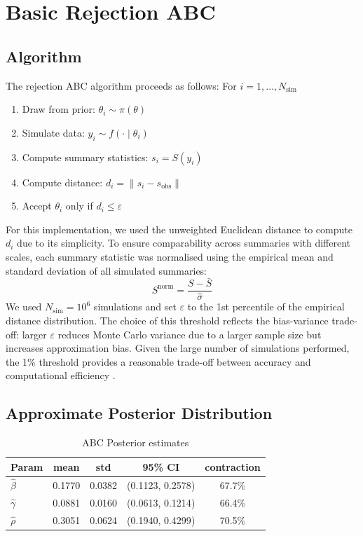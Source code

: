 \documentclass[12pt, a4paper]{article}
\begin{document}
\section{Basic Rejection ABC}
\subsection{Algorithm}
The rejection ABC algorithm proceeds as follows: For $i = 1, \dots, N_\text{sim}$
\begin{enumerate}
    \item Draw from prior: $\theta_i \sim \pi(\theta)$ 
    \item Simulate data: $y_i \sim f(\cdot \mid \theta_i)$ 
    \item Compute summary statistics: $s_i = S(y_i)$
    \item Compute distance: $d_i = \|s_i - s_\text{obs}\| $
    \item Accept $\theta_i$ only if $d_i \leq \varepsilon$
\end{enumerate}

For this implementation, we used the unweighted Euclidean distance to compute $d_i$ due to its simplicity. To ensure comparability across summaries with different scales, each summary statistic was normalised using the empirical mean and standard deviation of all simulated summaries: 
$$ S^{\text{norm}} = \frac{S - \bar{S}}{\hat{\sigma}}$$
We used $N_\text{sim} = 10^6$ simulations and set $\varepsilon$ to the 1st percentile of the empirical distance distribution. The choice of this threshold reflects the bias-variance trade-off: larger $\varepsilon$ reduces Monte Carlo variance due to a larger sample size but increases approximation bias. Given the large number of simulations performed, the 1\% threshold provides a reasonable trade-off between accuracy and computational efficiency \citep{beaumont2002approximate}.

\subsection{Approximate Posterior Distribution}
\begin{table}[h]
\centering
\begin{tabular}{lcccc}
\toprule
Param          & mean   & std    & 95\% CI              & contraction \\ \midrule
$\hat{\beta}$  & 0.1770 & 0.0382 & {(}0.1123, 0.2578{)} & 67.7\%      \\
$\hat{\gamma}$ & 0.0881 & 0.0160 & {(}0.0613, 0.1214{)} & 66.4\%      \\
$\hat{\rho}$   & 0.3051 & 0.0624 & {(}0.1940, 0.4299{)} & 70.5\%      \\ \bottomrule
\end{tabular}
\caption{ABC Posterior estimates}
\end{table}
\end{document}
